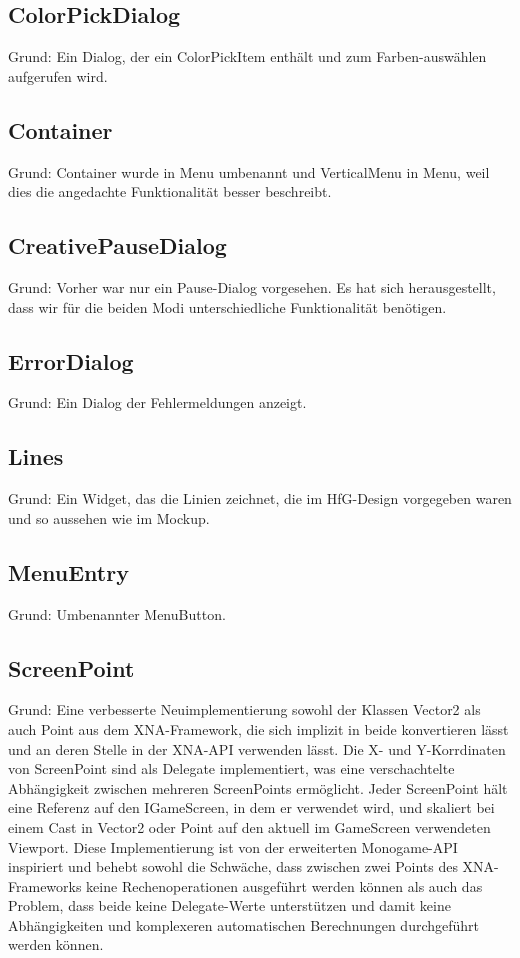 \subsection{ColorPickDialog}
Grund: Ein Dialog, der ein ColorPickItem enthält und zum Farben-auswählen aufgerufen wird.
\subsection{Container}
Grund: Container wurde in Menu umbenannt und VerticalMenu in Menu, weil dies die angedachte Funktionalität besser beschreibt.
\subsection{CreativePauseDialog}
Grund: Vorher war nur ein Pause-Dialog vorgesehen. Es hat sich herausgestellt, dass wir für die beiden Modi unterschiedliche Funktionalität benötigen.
\subsection{ErrorDialog}
Grund: Ein Dialog der Fehlermeldungen anzeigt.
\subsection{Lines}
Grund: Ein Widget, das die Linien zeichnet, die im HfG-Design vorgegeben waren und so aussehen wie im Mockup.
\subsection{MenuEntry}
Grund: Umbenannter MenuButton.
\subsection{ScreenPoint}
Grund: Eine verbesserte Neuimplementierung sowohl der Klassen Vector2 als auch Point aus dem XNA-Framework, die sich implizit in beide konvertieren lässt und an deren Stelle in der XNA-API verwenden lässt. Die X- und Y-Korrdinaten von ScreenPoint sind als Delegate implementiert, was eine verschachtelte Abhängigkeit zwischen mehreren ScreenPoints ermöglicht. Jeder ScreenPoint hält eine Referenz auf den IGameScreen, in dem er verwendet wird, und skaliert bei einem Cast in Vector2 oder Point auf den aktuell im GameScreen verwendeten Viewport. Diese Implementierung ist von der erweiterten Monogame-API inspiriert und behebt sowohl die Schwäche, dass zwischen zwei Points des XNA-Frameworks keine Rechenoperationen ausgeführt werden können als auch das Problem, dass beide keine Delegate-Werte unterstützen und damit keine Abhängigkeiten und komplexeren automatischen Berechnungen durchgeführt werden können.
